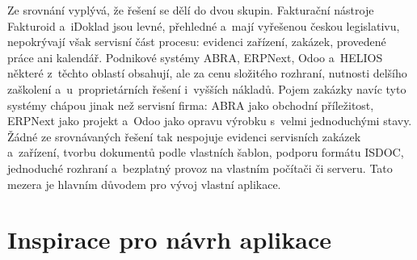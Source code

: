 Ze srovnání vyplývá, že řešení se dělí do dvou skupin. Fakturační nástroje Fakturoid a~iDoklad jsou levné, přehledné a~mají vyřešenou českou legislativu, nepokrývají však servisní část procesu: evidenci zařízení, zakázek, provedené práce ani kalendář. Podnikové systémy ABRA, ERPNext, Odoo a~HELIOS některé z~těchto oblastí obsahují, ale za cenu složitého rozhraní, nutnosti delšího zaškolení a~u~proprietárních řešení i~vyšších nákladů. Pojem zakázky navíc tyto systémy chápou jinak než servisní firma: ABRA jako obchodní příležitost, ERPNext jako projekt a~Odoo jako opravu výrobku s~velmi jednoduchými stavy. Žádné ze srovnávaných řešení tak nespojuje evidenci servisních zakázek a~zařízení, tvorbu dokumentů podle vlastních šablon, podporu formátu ISDOC, jednoduché rozhraní a~bezplatný provoz na vlastním počítači či serveru. Tato mezera je hlavním důvodem pro vývoj vlastní aplikace.

\section{Inspirace pro návrh aplikace}\label{sec:reserse-inspirace}

